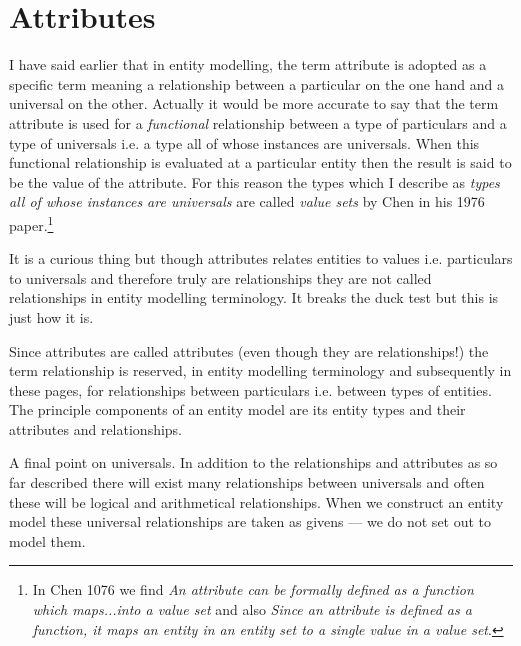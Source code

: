 

\section{Attributes}
\label{Attributes}
\mynote I have said earlier that in entity modelling, the term attribute is adopted as a specific term meaning a relationship between a particular on the one hand and a universal on the other. Actually it would be more accurate to say that the term attribute is used for a \textit{functional} relationship between a type of particulars and a type of universals i.e. a type all of whose instances are universals.
When this functional relationship is evaluated at a particular entity then the result is said to be the value of the attribute. For this reason the types which I describe as \textit{types all of whose instances are universals} are called \textit{value sets} by Chen in his  1976 paper.\footnote{
In Chen 1076 we find \textit{An attribute can be formally defined as a function which maps...into a value set} and also \textit{Since an attribute is defined as a function, it maps an entity in an entity set to a single value in a value set}.}

\mynote
 It is a curious thing but though attributes relates entities to  values i.e. particulars to universals
 and therefore truly are relationships they are not called relationships in entity modelling terminology. It breaks the duck test but this is just how it is. 

\mynote Since attributes are called attributes (even though they are relationships!) the term relationship is reserved, in entity modelling terminology and subsequently in these pages, for relationships between particulars i.e. between types of entities. 
 The principle components of an entity model are its entity types and their attributes and relationships.

\mynote A final point on universals. In addition to the relationships and attributes as so far described there will exist many relationships between universals and often these will be logical and arithmetical relationships. When we construct an entity model these universal relationships are taken as givens --- we do not set out to model them.


